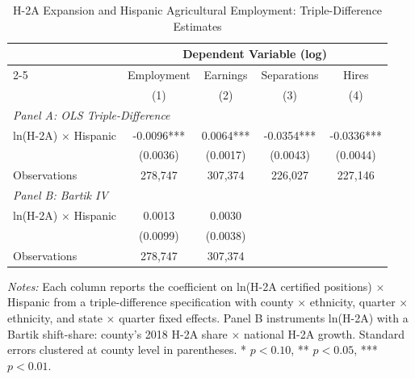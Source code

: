 \begin{table}[htbp]
\centering
\caption{H-2A Expansion and Hispanic Agricultural Employment: Triple-Difference Estimates}
\label{tab:main}
\small
\begin{tabular}{lcccc}
\hline\hline
 & \multicolumn{4}{c}{Dependent Variable (log)} \\
\cmidrule(lr){2-5}
 & Employment & Earnings & Separations & Hires \\
 & (1) & (2) & (3) & (4) \\
\hline
\multicolumn{5}{l}{\textit{Panel A: OLS Triple-Difference}} \\
ln(H-2A) $\times$ Hispanic & -0.0096*** & 0.0064*** & -0.0354*** & -0.0336*** \\
 & (0.0036) & (0.0017) & (0.0043) & (0.0044) \\
Observations & 278,747 & 307,374 & 226,027 & 227,146 \\
\hline
\multicolumn{5}{l}{\textit{Panel B: Bartik IV}} \\
ln(H-2A) $\times$ Hispanic & 0.0013 & 0.0030 & & \\
 & (0.0099) & (0.0038) & & \\
Observations & 278,747 & 307,374 & & \\
\hline\hline
\end{tabular}
\begin{tablenotes}
\item \textit{Notes:} Each column reports the coefficient on ln(H-2A certified positions) $\times$ Hispanic from a triple-difference specification with county $\times$ ethnicity, quarter $\times$ ethnicity, and state $\times$ quarter fixed effects. Panel B instruments ln(H-2A) with a Bartik shift-share: county's 2018 H-2A share $\times$ national H-2A growth. Standard errors clustered at county level in parentheses. * $p<0.10$, ** $p<0.05$, *** $p<0.01$.
\end{tablenotes}
\end{table}

